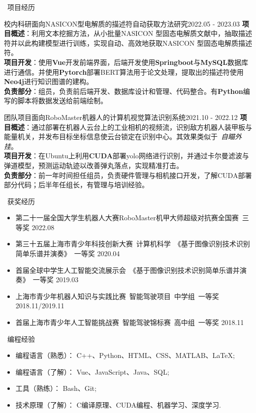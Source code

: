 \documentclass[UTF8]{resume}
\begin{document}
\begin{rSection}{\faUsers~项目经历}
    \begin{rProject}{校内科研}{面向NASICON型电解质的描述符自动获取方法研究}{2022.05 - 2023.03}
        \textbf{项目概述}：利用文本挖掘方法，从小批量NASICON 型固态电解质文献中，抽取描述符并以此构建模型进行训练，实现自动、高效地获取NASICON 型固态电解质描述符。\\
        \textbf{项目开发}：使用\textbf{Vue}开发前端界面，后端开发使用\textbf{Springboot}与\textbf{MySQL}数据库进行通信。并使用\textbf{Pytorch}部署BERT算法用于论文处理，提取出的描述符使用\textbf{Neo4j}进行知识图谱的建构。\\
        \textbf{负责部分}：组员，负责前后端开发、数据库设计和管理、代码整合。有\textbf{Python}编写的脚本将数据发送给前端绘制。
    \end{rProject}

    \begin{rProject}{团队项目}{面向RoboMaster机器人的计算机视觉算法识别系统}{2021.10 - 2022.12}
        \textbf{项目概述}：通过部署在机器人云台上的工业相机的视频流，识别敌方机器人装甲板与能量机关，并发布目标坐标信息使云台锁定在识别中心。其效果类似于~\textit{自瞄外挂}。\\
        \textbf{项目开发}：在Ubuntu上利用\textbf{CUDA}部署yolo网络进行识别，并通过卡尔曼滤波与弹道模型，预测运动轨迹以改善弹丸落点，实现精准打击。\\
        \textbf{负责部分}：前一年时间担任组员，负责硬件管理与相机接口开发，了解CUDA部署部分代码；后半年任组长，有管理与培训经验。
    \end{rProject}
\end{rSection}

\begin{rSection}{\faAward~获奖经历}
    \begin{itemize}
        \itemsep -0.5em
        \item 第二十一届全国大学生机器人大赛RoboMaster机甲大师超级对抗赛全国赛~三等奖 \hfill 2022.08
        \item 第三十五届上海市青少年科技创新大赛~计算机科学~《基于图像识别技术识别简单乐谱并演奏》~一等奖 \hfill 2020.04
        \item 首届全球中学生人工智能交流展示会~《基于图像识别技术识别简单乐谱并演奏》~一等奖 \hfill 2019.03
        \item 上海市青少年机器人知识与实践比赛~智能驾驶项目~中学组~一等奖 \hfill 2018.11/2019.11
        \item 首届上海市青少年人工智能挑战赛~智能驾驶锦标赛~高中组~一等奖 \hfill 2018.11
    \end{itemize}
\end{rSection}


\begin{rSection}{\faCogs~编程经验}
  \begin{itemize}
      \itemsep -0.5em
      \item 编程语言（熟悉）： C++、Python、HTML、CSS、MATLAB、\LaTeX; 
      \item 编程语言（了解）： Vue、JavaScript、Java、SQL;
      \item 工具（熟练）： Bash、Git; 
      \item 技术原理（了解）： C编译原理、CUDA编程、机器学习、深度学习.
  \end{itemize} 
\end{rSection}
\end{document}
